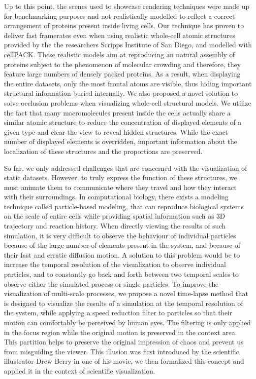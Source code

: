 Up to this point, the scenes used to showcase rendering techniques were made up for benchmarking purposes and not realistically modelled to reflect a correct arrangement of proteins present inside living cells.
Our technique has proven to deliver fast framerates even when using realistic whole-cell atomic structures provided by the the researchers Scripps Institute of San Diego, and modelled with cellPACK.
These realistic models aim at reproducing an natural assembly of proteins subject to the phenomenon of molecular crowding and therefore, they feature large numbers of densely packed proteins.
As a result, when displaying the entire datasets, only the most frontal atoms are visible, thus hiding important structural information buried internally.
We also proposed a novel solution to solve occlusion problems when visualizing whole-cell structural models.
We utilize the fact that many macromolecules present inside the cells actually share a similar atomic structure to reduce the concentration of displayed elements of a given type and clear the view to reveal hidden structures.
While the exact number of displayed elements is overridden, important information about the localization of these structures and the proportions are preserved.

So far, we only addressed challenges that are concerned with the visualization of static datasets.
However, to truly express the function of these structures, we must animate them to communicate where they travel and how they interact with their surroundings.
In computational biology, there exists a modeling technique called particle-based modeling, that can reproduce biological systems on the scale of entire cells while providing spatial information such as 3D trajectory and reaction history.
When directly viewing the results of such simulation, it is very difficult to observe the behaviour of individual particles because of the large number of elements present in the system, and because of their fast and erratic diffusion motion.
A solution to this problem would be to increase the temporal resolution of the visualization to observe individual particles, and to constantly go back and forth between two temporal scales to observe either the simulated process or single particles.
To improve the visualization of multi-scale processes, we propose a novel time-lapse method that is designed to visualize the results of a simulation at the temporal resolution of the system, while applying a speed reduction filter to particles so that their motion can comfortably be perceived by human eyes.
The filtering is only applied in the focus region while the original motion is preserved in the context area.
This partition helps to preserve the original impression of chaos and prevent us from misguiding the viewer.
This illusion was first introduced by the scientific illustrator Drew Berry in one of his movie, we then formalized this concept and applied it in the context of scientific visualization.

